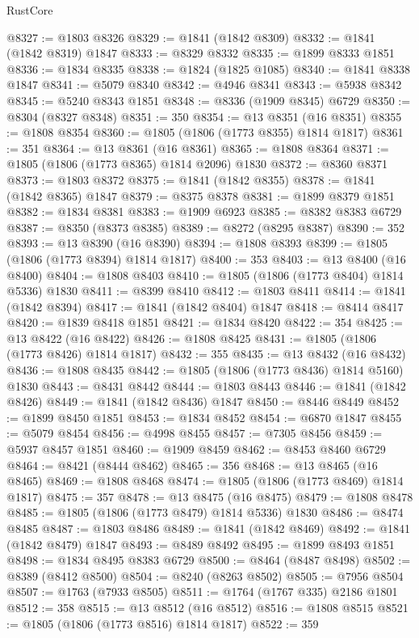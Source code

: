 \begin{lexlean}{RustCore}
\begin{coremodule}
@8327 := @1803 @8326
@8329 := @1841 (@1842 @8309)
@8332 := @1841 (@1842 @8319) @1847
@8333 := @8329 @8332
@8335 := @1899 @8333 @1851
@8336 := @1834 @8335
@8338 := @1824 (@1825 @1085)
@8340 := @1841 @8338 @1847
@8341 := @5079 @8340
@8342 := @4946 @8341
@8343 := @5938 @8342
@8345 := @5240 @8343 @1851
@8348 := @8336 (@1909 @8345) @6729
@8350 := @8304 (@8327 @8348)
@8351 := 350
@8354 := @13 @8351 (@16 @8351)
@8355 := @1808 @8354
@8360 := @1805 (@1806 (@1773 @8355) @1814 @1817)
@8361 := 351
@8364 := @13 @8361 (@16 @8361)
@8365 := @1808 @8364
@8371 := @1805 (@1806 (@1773 @8365) @1814 @2096) @1830
@8372 := @8360 @8371
@8373 := @1803 @8372
@8375 := @1841 (@1842 @8355)
@8378 := @1841 (@1842 @8365) @1847
@8379 := @8375 @8378
@8381 := @1899 @8379 @1851
@8382 := @1834 @8381
@8383 := @1909 @6923
@8385 := @8382 @8383 @6729
@8387 := @8350 (@8373 @8385)
@8389 := @8272 (@8295 @8387)
@8390 := 352
@8393 := @13 @8390 (@16 @8390)
@8394 := @1808 @8393
@8399 := @1805 (@1806 (@1773 @8394) @1814 @1817)
@8400 := 353
@8403 := @13 @8400 (@16 @8400)
@8404 := @1808 @8403
@8410 := @1805 (@1806 (@1773 @8404) @1814 @5336) @1830
@8411 := @8399 @8410
@8412 := @1803 @8411
@8414 := @1841 (@1842 @8394)
@8417 := @1841 (@1842 @8404) @1847
@8418 := @8414 @8417
@8420 := @1839 @8418 @1851
@8421 := @1834 @8420
@8422 := 354
@8425 := @13 @8422 (@16 @8422)
@8426 := @1808 @8425
@8431 := @1805 (@1806 (@1773 @8426) @1814 @1817)
@8432 := 355
@8435 := @13 @8432 (@16 @8432)
@8436 := @1808 @8435
@8442 := @1805 (@1806 (@1773 @8436) @1814 @5160) @1830
@8443 := @8431 @8442
@8444 := @1803 @8443
@8446 := @1841 (@1842 @8426)
@8449 := @1841 (@1842 @8436) @1847
@8450 := @8446 @8449
@8452 := @1899 @8450 @1851
@8453 := @1834 @8452
@8454 := @6870 @1847
@8455 := @5079 @8454
@8456 := @4998 @8455
@8457 := @7305 @8456
@8459 := @5937 @8457 @1851
@8460 := @1909 @8459
@8462 := @8453 @8460 @6729
@8464 := @8421 (@8444 @8462)
@8465 := 356
@8468 := @13 @8465 (@16 @8465)
@8469 := @1808 @8468
@8474 := @1805 (@1806 (@1773 @8469) @1814 @1817)
@8475 := 357
@8478 := @13 @8475 (@16 @8475)
@8479 := @1808 @8478
@8485 := @1805 (@1806 (@1773 @8479) @1814 @5336) @1830
@8486 := @8474 @8485
@8487 := @1803 @8486
@8489 := @1841 (@1842 @8469)
@8492 := @1841 (@1842 @8479) @1847
@8493 := @8489 @8492
@8495 := @1899 @8493 @1851
@8498 := @1834 @8495 @8383 @6729
@8500 := @8464 (@8487 @8498)
@8502 := @8389 (@8412 @8500)
@8504 := @8240 (@8263 @8502)
@8505 := @7956 @8504
@8507 := @1763 (@7933 @8505)
@8511 := @1764 (@1767 @335) @2186 @1801
@8512 := 358
@8515 := @13 @8512 (@16 @8512)
@8516 := @1808 @8515
@8521 := @1805 (@1806 (@1773 @8516) @1814 @1817)
@8522 := 359

\end{coremodule}
\end{lexlean}
